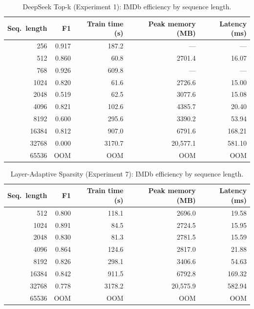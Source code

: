 \documentclass[11pt]{article}
\begin{document}
\begin{table}[ht]
  \centering
  \small
  \caption{DeepSeek Top-k (Experiment 1): IMDb efficiency by sequence length.}
  \label{tab:eff-deepseek}
  \begin{tabular}{@{}rrrrr@{}}
    \toprule
    Seq.\ length & F1 & Train time (s) & Peak memory (MB) & Latency (ms) \\
    \midrule
    256    & 0.917 & 187.2  & ---      & ---   \\
    512    & 0.860 & 60.8   & 2701.4   & 16.07 \\
    768    & 0.926 & 609.8  & ---      & ---   \\
    1024   & 0.820 & 61.6   & 2726.6   & 15.00 \\
    2048   & 0.519 & 62.5   & 3077.6   & 15.08 \\
    4096   & 0.821 & 102.6  & 4385.7   & 20.40 \\
    8192   & 0.600 & 295.6  & 3390.2   & 53.94 \\
    16384  & 0.812 & 907.0  & 6791.6   & 168.21 \\
    32768  & 0.000 & 3170.7 & 20{,}577.1 & 581.10 \\
    65536  & OOM   & OOM    & OOM      & OOM   \\
    \bottomrule
  \end{tabular}
\end{table}

\begin{table}[ht]
  \centering
  \small
  \caption{Layer-Adaptive Sparsity (Experiment 7): IMDb efficiency by
  sequence length.}
  \label{tab:eff-layeradaptive}
  \begin{tabular}{@{}rrrrr@{}}
    \toprule
    Seq.\ length & F1 & Train time (s) & Peak memory (MB) & Latency (ms) \\
    \midrule
    512    & 0.800 & 118.1  & 2696.0   & 19.58 \\
    1024   & 0.891 & 84.5   & 2724.5   & 15.95 \\
    2048   & 0.830 & 81.3   & 2781.5   & 15.59 \\
    4096   & 0.864 & 124.6  & 2817.0   & 21.88 \\
    8192   & 0.826 & 298.1  & 3406.6   & 54.63 \\
    16384  & 0.842 & 911.5  & 6792.8   & 169.32 \\
    32768  & 0.778 & 3178.2 & 20{,}575.9 & 582.94 \\
    65536  & OOM   & OOM    & OOM      & OOM   \\
    \bottomrule
  \end{tabular}
\end{table}
\end{document}
